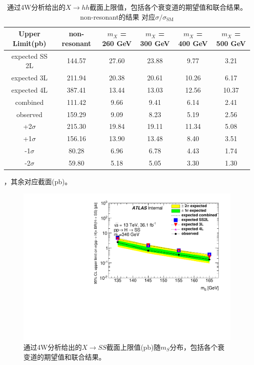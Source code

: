 \begin{table}[h]
\scriptsize
  \centering
  \begin{tabular}{c|c|c|c|c|c}
  \hline
Upper Limit(pb) &non-resonant   &$m_{X}$ = 260 GeV        &$m_{X}$ = 300 GeV        &$m_{X}$ = 400 GeV        &$m_{X}$ = 500 GeV\\
\hline
expected SS 2L  &144.57 &27.60  &23.88  &9.77   &3.21   \\
\hline
expected 3L     &211.94 &20.38  &20.61  &10.26  &6.17   \\
\hline
expected 4L     &387.41 &13.44  &13.03  &12.56  &10.37  \\
\hline
combined        &111.42 &9.66   &9.41   &6.14   &2.41   \\
\hline
observed        &159.29 &9.09   &8.23   &5.19   &2.56   \\
\hline
+2$\sigma$     &215.30  &19.84  &19.11  &11.34  &5.08   \\
\hline
+1$\sigma$     &156.16  &13.90  &13.48  &8.40   &3.51   \\
\hline
-1$\sigma$     &80.28   &6.96   &6.78   &4.43   &1.74   \\
\hline
-2$\sigma$     &59.80   &5.18   &5.05   &3.30   &1.30   \\
\hline
\hline
  \end{tabular}
\caption{通过4W分析给出的$X\rightarrow hh$截面上限值，包括各个衰变道的期望值和联合结果。non-resonant的结果
对应$\sigma/\sigma_{\text{SM}}$}，其余对应截面(pb)。
  \label{tab:limit-comb}
\end{table}
\begin{figure}
  \centering
  \includegraphics[width=.65\textwidth,angle=-90]{fig/Statistical/combination/limit-comb-SS-AllSys-mS.pdf}
  \caption{通过4W分析给出的$X\rightarrow SS$截面上限值(pb)随$m_S$分布，包括各个衰变道的期望值和联合结果。}
  \label{fig:limit-comb-SS-mS}
\end{figure}
